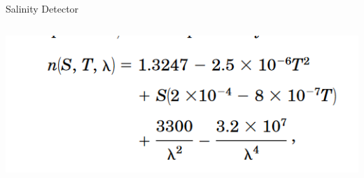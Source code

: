 \begin{frame}{Salinity Detector}
    \begin{columns}
        \begin{column}{\textwidth}
            \centering
            \includegraphics[width=\textwidth,keepaspectratio]{fs-images/image (5).png}
        \end{column}
    \end{columns}
\end{frame}


